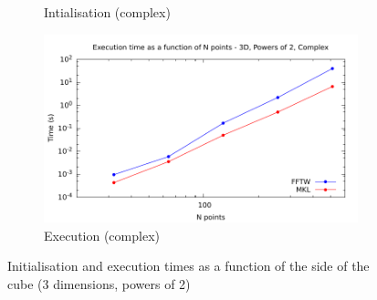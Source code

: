 \documentclass[12pt, a4paper]{article}
\begin{document}
\begin{figure}[H]
\begin{subfigure}{.5\textwidth}
\caption{Intialisation (complex)}
\label{3DPOW2CI}
\end{subfigure}%
\begin{subfigure}{.5\textwidth}
\centering
\includegraphics[width=.9\linewidth]{graphs/3d-pow2-exec-c.pdf}
\caption{Execution (complex)}
\label{3DPOW2C}
\end{subfigure}
\caption{Initialisation and execution times as a function of the side of the cube (3 dimensions, powers of 2)}
\label{3DPOW2}
\end{figure}
\end{document}
